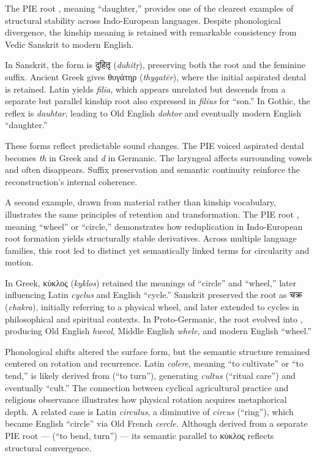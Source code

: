 The PIE root , meaning “daughter,” provides one of the clearest examples of structural stability across Indo-European languages. Despite phonological divergence, the kinship meaning is retained with remarkable consistency from Vedic Sanskrit to modern English.

In Sanskrit, the form is \textsanskrit{दुहितृ} (\emph{duhitṛ}), preserving both the root and the feminine suffix. Ancient Greek gives \textgreek{θυγάτηρ} (\emph{thygatēr}), where the initial aspirated dental is retained. Latin yields \emph{filia}, which appears unrelated but descends from a separate but parallel kinship root also expressed in \emph{filius} for “son.” In Gothic, the reflex is \emph{dauhtar}, leading to Old English \emph{dohtor} and eventually modern English “daughter.”

These forms reflect predictable sound changes. The PIE voiced aspirated dental  becomes \emph{th} in Greek and \emph{d} in Germanic. The laryngeal  affects surrounding vowels and often disappears. Suffix preservation and semantic continuity reinforce the reconstruction's internal coherence.

A second example, drawn from material rather than kinship vocabulary, illustrates the same principles of retention and transformation. The PIE root , meaning “wheel” or “circle,” demonstrates how reduplication in Indo-European root formation yields structurally stable derivatives. Across multiple language families, this root led to distinct yet semantically linked terms for circularity and motion.

In Greek, \textgreek{κύκλος} (\emph{kyklos}) retained the meanings of “circle” and “wheel,” later influencing Latin \emph{cyclus} and English “cycle.” Sanskrit preserved the root as \textsanskrit{चक्र} (\emph{chakra}), initially referring to a physical wheel, and later extended to cycles in philosophical and spiritual contexts. In Proto-Germanic, the root evolved into , producing Old English \emph{hweol}, Middle English \emph{whele}, and modern English “wheel.”

Phonological shifts altered the surface form, but the semantic structure remained centered on rotation and recurrence. Latin \emph{colere}, meaning “to cultivate” or “to tend,” is likely derived from  (“to turn”), generating \emph{cultus} (“ritual care”) and eventually “cult.” The connection between cyclical agricultural practice and religious observance illustrates how physical rotation acquires metaphorical depth. A related case is Latin \emph{circulus}, a diminutive of \emph{circus} (“ring”), which became English “circle” via Old French \emph{cercle}. Although derived from a separate PIE root —  (“to bend, turn”) — its semantic parallel to \textgreek{κύκλος} reflects structural convergence.

